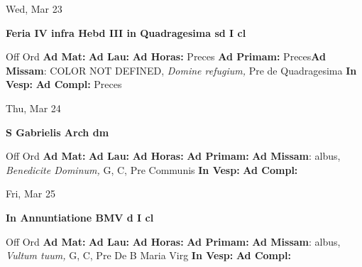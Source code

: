 \documentclass[10pt]{memoir}
\begin{document}
\begin{center}
\begin{minipage}{3.5in}
\vspace{2em}
\begin{center}Wed, Mar 23
\end{center}
\textbf{ \large Feria IV infra Hebd III in Quadragesima
\textnormal{\normalsize sd I cl}}

\begin{justify}Off Ord
\textbf{Ad Mat: }
\textbf{Ad Lau: }
\textbf{Ad Horas: }Preces
\textbf{Ad Primam: }Preces\textbf{Ad Missam}: COLOR NOT DEFINED, \textit{Domine refugium,} Pre de Quadragesima
\textbf{In Vesp: }
\textbf{Ad Compl: }Preces
\end{justify}
\end{minipage}
\end{center}

\begin{center}
\begin{minipage}{3.5in}
\vspace{2em}
\begin{center}Thu, Mar 24
\end{center}
\textbf{ \large S Gabrielis Arch
\textnormal{\normalsize dm}}

\begin{justify}Off Ord
\textbf{Ad Mat: }
\textbf{Ad Lau: }
\textbf{Ad Horas: }
\textbf{Ad Primam: }\textbf{Ad Missam}: albus, \textit{Benedicite Dominum,} G, C, Pre Communis
\textbf{In Vesp: }
\textbf{Ad Compl: }
\end{justify}
\end{minipage}
\end{center}

\begin{center}
\begin{minipage}{3.5in}
\vspace{2em}
\begin{center}Fri, Mar 25
\end{center}
\textbf{ \large In Annuntiatione BMV
\textnormal{\normalsize d I cl}}

\begin{justify}Off Ord
\textbf{Ad Mat: }
\textbf{Ad Lau: }
\textbf{Ad Horas: }
\textbf{Ad Primam: }\textbf{Ad Missam}: albus, \textit{Vultum tuum,} G, C, Pre De B Maria Virg
\textbf{In Vesp: }
\textbf{Ad Compl: }
\end{justify}
\end{minipage}
\end{center}
\end{document}
